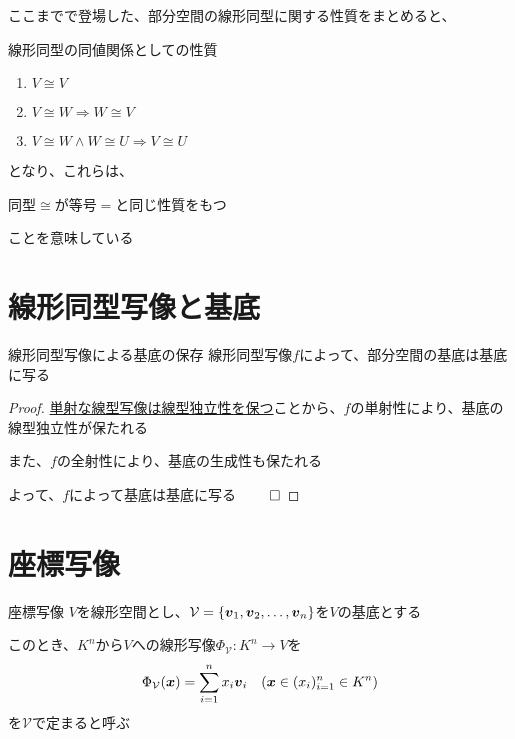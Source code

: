 \documentclass[../../../topic_linear-algebra]{subfiles}
\begin{document}
\sectionline

ここまでで登場した、部分空間の線形同型に関する性質をまとめると、

\begin{theorem}{線形同型の同値関係としての性質}
  \begin{enumerate}[label=\romanlabel]
    \item $V \cong V$
    \item $V \cong W \Longrightarrow W \cong V$
    \item $V \cong W \land W \cong U \Longrightarrow V \cong U$
  \end{enumerate}
\end{theorem}

となり、これらは、
\begin{shaded}
  同型$\cong$が等号$=$と同じ性質をもつ
\end{shaded}
ことを意味している

\sectionline
\section{線形同型写像と基底}

\begin{theorem}{線形同型写像による基底の保存}
  線形同型写像$f$によって、部分空間の基底は基底に写る
\end{theorem}

\begin{proof}
  \hyperref[thm:injective-preserves-independence]{単射な線型写像は線型独立性を保つ}ことから、$f$の単射性により、基底の線型独立性が保たれる

  また、$f$の全射性により、基底の生成性も保たれる

  よって、$f$によって基底は基底に写る $\qed$
\end{proof}

\sectionline
\section{座標写像}

\begin{definition}{座標写像}\label{def:coordinate-mapping}
  $V$を線形空間とし、$\mathcal{V} = \{ \vb*{v}_1, \vb*{v}_2, \dots, \vb*{v}_n \}$を$V$の基底とする

  このとき、$K^n$から$V$への線形写像$\Phi_{\mathcal{V}}\colon K^n \to V$を
  \begin{equation*}
    \Phi_{\mathcal{V}}(\vb*{x}) = \sum_{i=1}^n x_i \vb*{v}_i \quad (\vb*{x} \in (x_i)_{i=1}^n \in K^n)
  \end{equation*}
  を$\mathcal{V}$で定まると呼ぶ
\end{definition}
\end{document}
